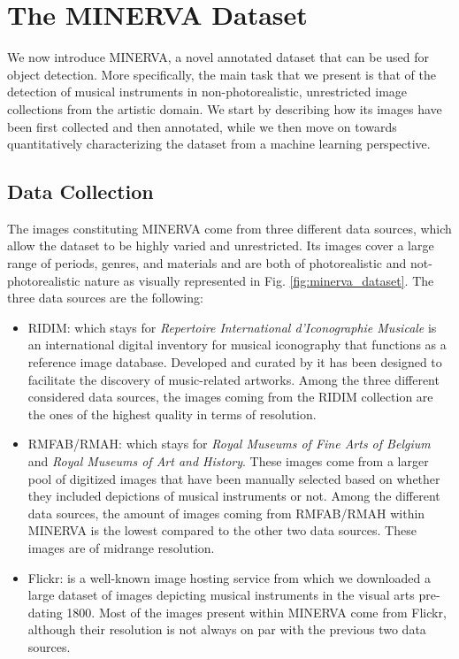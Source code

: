 \section{The MINERVA Dataset}
\label{sec:minerva_dataset}

We now introduce MINERVA, a novel annotated dataset that can be used for object detection. More specifically, the main task that we present is that of the detection of musical instruments in non-photorealistic, unrestricted image collections from the artistic domain. We start by describing how its images have been first collected and then annotated, while we then move on towards quantitatively characterizing the dataset from a machine learning perspective.    

\subsection{Data Collection}
The images constituting MINERVA come from three different data sources, which allow the dataset to be highly varied and unrestricted. Its images cover a large range of periods, genres, and materials and are both of photorealistic and not-photorealistic nature as visually represented in Fig. \ref{fig:minerva_dataset}. The three data sources are the following:
\begin{itemize}
	\item RIDIM: which stays for \textit{Repertoire International d'Iconographie Musicale} is an international digital inventory for musical iconography that functions as a reference image database. Developed and curated by \citet{green2013ridim} it has been designed to facilitate the discovery of music-related artworks. Among the three different considered data sources, the images coming from the RIDIM collection are the ones of the highest quality in terms of resolution.
	\item RMFAB/RMAH: which stays for \textit{Royal Museums of Fine Arts of Belgium} and \textit{Royal Museums of Art and History}. These images come from a larger pool of digitized images that have been manually selected based on whether they included depictions of musical instruments or not. Among the different data sources, the amount of images coming from RMFAB/RMAH within MINERVA is the lowest compared to the other two data sources. These images are of midrange resolution.
	\item Flickr: is a well-known image hosting service from which we downloaded a large dataset of images depicting musical instruments in the visual arts pre-dating 1800. Most of the images present within MINERVA come from Flickr, although their resolution is not always on par with the previous two data sources.  
\end{itemize}

